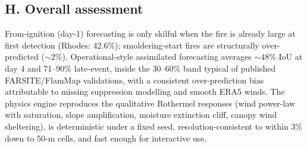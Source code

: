 \documentclass[11pt]{article}
\begin{document}
\subsection*{H. Overall assessment}

From-ignition (day-1) forecasting is only skilful when the fire is
already large at first detection (Rhodes: 42.6\%); smoldering-start fires
are structurally over-predicted (${\sim}2\%$). Operational-style
assimilated forecasting averages ${\sim}48\%$ IoU at day 4 and 71--90\%
late-event, inside the 30--60\% band typical of published FARSITE/FlamMap
validations, with a consistent over-prediction bias attributable to
missing suppression modelling and smooth ERA5 winds. The physics engine
reproduces the qualitative Rothermel responses (wind power-law with
saturation, slope amplification, moisture extinction cliff, canopy wind
sheltering), is deterministic under a fixed seed, resolution-consistent
to within 3\% down to 50-m cells, and fast enough for interactive use.
\end{document}
